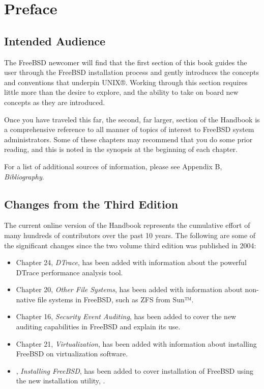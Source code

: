\chapter{Preface}

\section{Intended Audience}

The FreeBSD newcomer will find that the first section of this book guides the
user through the FreeBSD installation process and gently introduces the concepts
and conventions that underpin UNIX®.
Working through this section requires little more than the desire to explore,
and the ability to take on board new concepts as they are introduced.

Once you have traveled this far, the second, far larger, section of the Handbook
is a comprehensive reference to all manner of topics of interest to FreeBSD
system administrators.
Some of these chapters may recommend that you do some prior reading, and this is
noted in the synopsis at the beginning of each chapter.

For a list of additional sources of information, please see Appendix B,
\emph{Bibliography}.




\section{Changes from the Third Edition}

The current online version of the Handbook represents the cumulative effort of
many hundreds of contributors over the past 10 years.
The following are some of the significant changes since the two volume third
edition was published in 2004:
\begin{itemize}
\item
   Chapter 24, \emph{DTrace}, has been added with information about the powerful
   DTrace performance analysis tool.
\item
   Chapter 20, \emph{Other File Systems}, has been added with information about
   non-native file systems in FreeBSD, such as ZFS from Sun™.
\item
   Chapter 16, \emph{Security Event Auditing}, has been added to cover the new
   auditing capabilities in FreeBSD and explain its use.
\item
   Chapter 21, \emph{Virtualization}, has been added with information about
   installing FreeBSD on virtualization software.
\item
   ,  \emph{Installing FreeBSD}, has been added to cover installation of
   FreeBSD using the new installation utility, .
\end{itemize}



